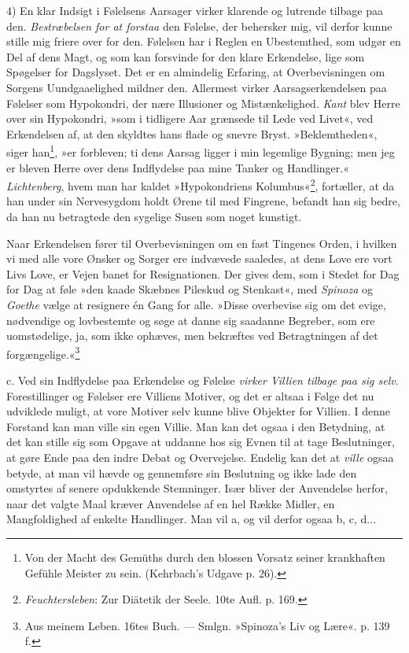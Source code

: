 \documentclass[12pt,a4paper,openany]{book}
\newcommand{\opage}[1]{\marginnote{\footnotesize\textit{[#1]}}}
\begin{document}
4) En klar Indsigt i Følelsens Aarsager virker klarende og lutrende
tilbage paa den. \emph{Bestræbelsen for at forstaa} den Følelse, der
behersker mig, vil derfor kunne stille mig friere over for den. Følelsen
har i Reglen en Ubestemthed, som udgør en Del af dens Magt, og som kan
forsvinde for
\opage{390}den klare Erkendelse, lige som Spøgelser for Dagslyset. Det
er en almindelig Erfaring, at Overbevisningen om Sorgens Uundgaaelighed
mildner den. Allermest virker Aarsagserkendelsen paa Følelser som
Hypokondri, der nære Illusioner og Mistænkelighed. \emph{Kant} blev
Herre over sin Hypokondri, »som i tidligere Aar grænsede til Lede ved
Livet«, ved Erkendelsen af, at den skyldtes hans flade og snevre Bryst.
»Beklemtheden«, siger han\footnote[1]{Von der Macht des Gemüths durch
den blossen Vorsatz seiner krankhaften Gefühle Meister zu sein.
(Kehrbach’s Udgave p. 26).}, »er forbleven; ti dens Aarsag ligger i min
legemlige Bygning; men jeg er bleven Herre over dens Indflydelse paa
mine Tanker og Handlinger.« \emph{Lichtenberg}, hvem man har kaldet
»Hypokondriens Kolumbus«\footnote[2]{\emph{Feuchtersleben}: Zur Diätetik
der Seele. 10te Aufl. p. 169.}, fortæller, at da han under sin
Nervesygdom holdt Ørene til med Fingrene, befandt han sig bedre, da han
nu betragtede den sygelige Susen som noget kunstigt.

Naar Erkendelsen fører til Overbevisningen om en fast Tingenes Orden, i
hvilken vi med alle vore Ønsker og Sorger ere indvævede saaledes, at
dens Love ere vort Livs Love, er Vejen banet for Resignationen. Der
gives dem, som i Stedet for Dag for Dag at føle »den kaade Skæbnes
Pileskud og Stenkast«, med \emph{Spinoza} og \emph{Goethe} vælge at
resignere én Gang for alle. »Disse overbevise sig om det evige,
nødvendige og lovbestemte og søge at danne sig saadanne Begreber, som
ere uomstødelige, ja, som ikke ophæves, men bekræftes ved Betragtningen
af det forgængelige.«\footnote[3]{Aus meinem Leben. 16tes Buch. ---
Smlgn. »Spinoza’s Liv og Lære«. p. 139 f.}

c. Ved sin Indflydelse paa Erkendelse og Følelse \emph{virker Villien
tilbage paa sig selv}. Forestillinger og Følelser ere Villiens Motiver,
og det er altsaa i Følge det nu udviklede muligt, at vore Motiver selv
kunne blive Objekter for Villien. I denne Forstand kan man ville sin
egen Villie. Man kan det ogsaa i den Betydning, at det kan stille sig
som Opgave at uddanne hos sig Evnen til at tage Beslutninger, at gøre
Ende paa den indre Debat og Overvejelse. Endelig kan det at \emph{ville}
ogsaa betyde, at man vil hævde og gennemføre sin Beslutning og ikke lade
den omstyrtes af senere opdukkende
\opage{391}Stemninger. Især bliver der Anvendelse herfor, naar det
valgte Maal kræver Anvendelse af en hel Række Midler, en Mangfoldighed
af enkelte Handlinger. Man vil a, og vil derfor ogsaa b, c, d...
\end{document}
